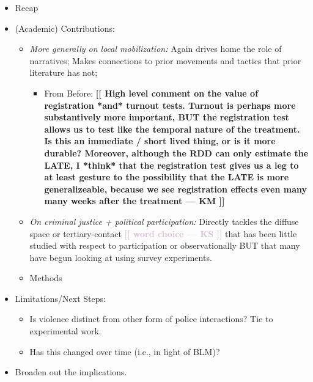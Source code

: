 \documentclass[12pt]{article}
\newcommand{\kscomment}[1]{\textbf{\textcolor{Thistle}{[[ #1 --- KS ]]}}}
\newcommand{\kmcomment}[1]{\textbf{\textcolor{JungleGreen}{[[ #1 --- KM ]]}}}
\begin{document}
\begin{itemize}
    \item Recap
    \item (Academic) Contributions: 
    \begin{itemize}
        \item \textit{More generally on local mobilization:} Again drives home the role of narratives; Makes connections to prior movements and tactics that prior literature has not;
        \begin{itemize}
            \item From Before: \kmcomment{High level comment on the value of registration *and* turnout tests. Turnout is perhaps more substantively more important, BUT the registration test allows us to test like the temporal nature of the treatment. Is this an immediate / short lived thing, or is it more durable? Moreover, although the RDD can only estimate the LATE, I *think* that the registration test gives us a leg to at least gesture to the possibility that the LATE is more generalizeable, because we see registration effects even many many weeks after the treatment}
        \end{itemize}
        \item \textit{On criminal justice + political participation:} Directly tackles the diffuse space or tertiary-contact \kscomment{word choice} that has been little studied with respect to participation or observationally BUT that many have begun looking at using survey experiments. 
        \item Methods
    \end{itemize}   
    \item Limitations/Next Steps:
    \begin{itemize}
        \item Is violence distinct from other form of police interactions? Tie to experimental work. 
        \item Has this changed over time (i.e., in light of BLM)?
        
    \end{itemize}
    \item Broaden out the implications.
\end{itemize}

\clearpage

\end{document}
